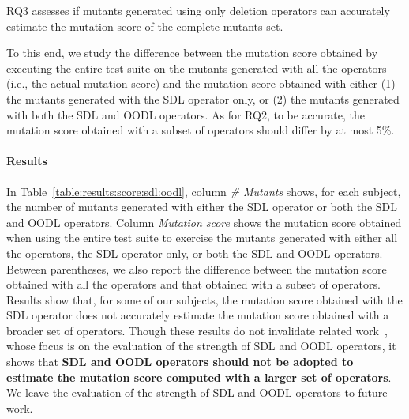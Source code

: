 RQ3 assesses if mutants generated using only deletion operators can accurately estimate the mutation score of the complete mutants set.

To this end, we study the difference between the mutation score obtained by executing the entire test suite on the mutants generated with all the operators (i.e., the actual mutation score) and the mutation score obtained with either (1) the mutants generated with the SDL operator only, or (2) the mutants generated with both the SDL and OODL operators.
As for RQ2, to be accurate, the mutation score obtained with a subset of operators should differ by at most 5\%.


\paragraph{Results}



In Table~\ref{table:results:score:sdl:oodl}, column \emph{\# Mutants} shows, for each subject, the number of mutants generated with either the SDL operator or both the SDL and OODL operators. 
Column \emph{Mutation score} shows the mutation score obtained when using the entire test suite to exercise the mutants generated with either all the operators, the SDL operator only, or both the SDL and OODL operators. Between parentheses, we also report the difference between the mutation score obtained with all the operators and that obtained with a subset of operators. Results show that, for some of our subjects, the mutation score obtained with the SDL operator does not accurately estimate the mutation score obtained with a broader set of operators. Though these results do not invalidate related work~\cite{delamaro2014experimental}, whose focus is on the evaluation of the strength of SDL and OODL operators, it shows that \textbf{SDL and OODL operators should not be adopted to estimate the mutation score computed with a larger set of operators}. We leave the evaluation of the strength of SDL and OODL operators to future work.





%
%

